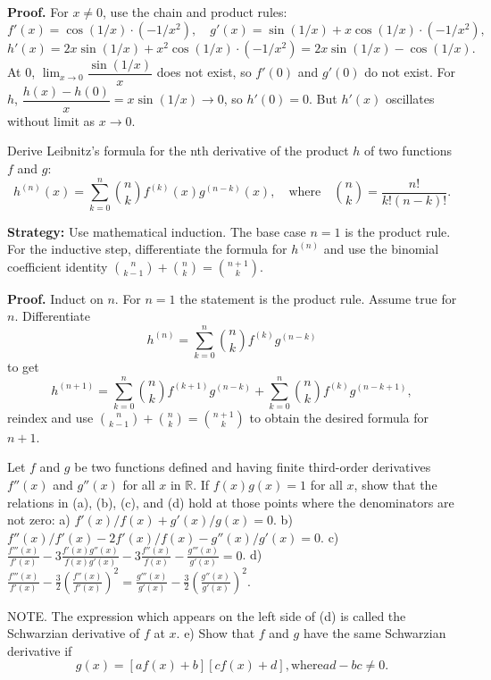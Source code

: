 \noindent\textbf{Proof.}
For $x\ne 0$, use the chain and product rules:
\[f'(x)=\cos(1/x)\cdot(-1/x^2),\quad g'(x)=\sin(1/x)+x\cos(1/x)\cdot(-1/x^2),\]
\[h'(x)=2x\sin(1/x)+x^2\cos(1/x)\cdot(-1/x^2)=2x\sin(1/x)-\cos(1/x).\]
At $0$, $\lim_{x\to 0}\dfrac{\sin(1/x)}{x}$ does not exist, so $f'(0)$ and $g'(0)$ do not exist. For $h$, $\dfrac{h(x)-h(0)}{x}=x\sin(1/x)\to 0$, so $h'(0)=0$. But $h'(x)$ oscillates without limit as $x\to 0$.



\begin{problembox}
\begin{problemstatement}
Derive Leibnitz's formula for the nth derivative of the product \( h \) of two functions \( f \) and \( g \):
\[ h^{(n)}(x) = \sum_{k=0}^{n} \binom{n}{k} f^{(k)}(x)g^{(n-k)}(x), \quad \text{where} \quad \binom{n}{k} = \frac{n!}{k!(n-k)!}. \]
\end{problemstatement}
\end{problembox}

\noindent\textbf{Strategy:} Use mathematical induction. The base case \( n = 1 \) is the product rule. For the inductive step, differentiate the formula for \( h^{(n)} \) and use the binomial coefficient identity \( \binom{n}{k-1} + \binom{n}{k} = \binom{n+1}{k} \).

\noindent\textbf{Proof.}
Induct on $n$. For $n=1$ the statement is the product rule. Assume true for $n$. Differentiate
\[h^{(n)}=\sum_{k=0}^n\binom{n}{k}f^{(k)}g^{(n-k)}\]
to get
\[h^{(n+1)}=\sum_{k=0}^n\binom{n}{k}f^{(k+1)}g^{(n-k)}+\sum_{k=0}^n\binom{n}{k}f^{(k)}g^{(n-k+1)},\]
reindex and use $\binom{n}{k-1}+\binom{n}{k}=\binom{n+1}{k}$ to obtain the desired formula for $n+1$.



\begin{problembox}
\begin{problemstatement}
Let \( f \) and \( g \) be two functions defined and having finite third-order derivatives \( f''(x) \) and \( g''(x) \) for all \( x \) in \( \mathbb{R} \). If \( f(x)g(x) = 1 \) for all \( x \), show that the relations in (a), (b), (c), and (d) hold at those points where the denominators are not zero:
a) \( f'(x)/f(x) + g'(x)/g(x) = 0 \).
b) \( f''(x)/f'(x) - 2f'(x)/f(x) - g''(x)/g'(x) = 0 \).
c) \( \frac{f'''(x)}{f'(x)} - 3\frac{f'(x)g''(x)}{f(x)g'(x)} - 3\frac{f''(x)}{f(x)} - \frac{g'''(x)}{g'(x)} = 0 \).
d) \( \frac{f'''(x)}{f'(x)} - \frac{3}{2}\left(\frac{f''(x)}{f'(x)}\right)^2 = \frac{g'''(x)}{g'(x)} - \frac{3}{2}\left(\frac{g''(x)}{g'(x)}\right)^2 \).

NOTE. The expression which appears on the left side of (d) is called the Schwarzian derivative of \( f \) at \( x \).
e) Show that \( f \) and \( g \) have the same Schwarzian derivative if
\[ g(x) = [af(x) + b][cf(x) + d], \text{where} ad - bc \neq 0. \]
\end{problemstatement}
\end{problembox}

